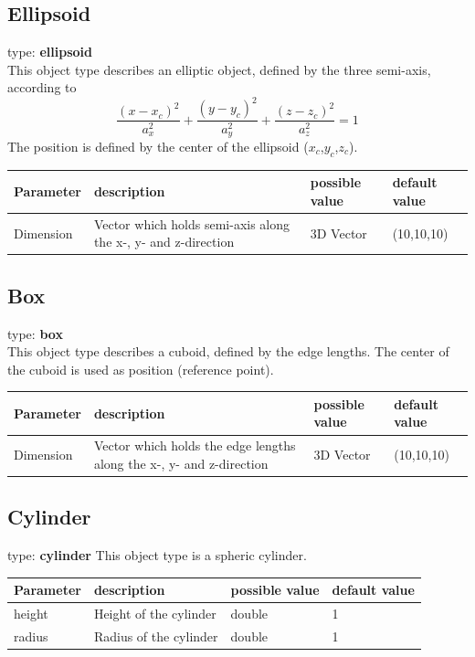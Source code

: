 \documentclass[a4paper,html,11pt,openany]{book}
\begin{document}
\subsection{Ellipsoid}
 type: \textbf {ellipsoid} \\
 This object type describes an elliptic object, defined by the three semi-axis, according to
  \begin{equation}
  \frac{(x-x_c)^2}{a_x^2}+\frac{(y-y_c)^2}{a_y^2}+\frac{(z-z_c)^2}{a_z^2}=1
\end{equation}   
The position is defined by the center of the ellipsoid ($x_c$,$y_c$,$z_c$).

\vspace{1em}
\begin{tabular}{p{2cm}|m{3.5cm}|m{3.0cm}|p{1.7cm}}
 Parameter  & description  & possible value & default value\\
 \hline
 Dimension & Vector which holds semi-axis along the x-, y- and z-direction & 3D Vector & (10,10,10) 
 \end{tabular}
 \subsection{Box}
 type: \textbf{box} \\
 This object type describes a cuboid, defined by the edge lengths. The center of the cuboid is used as position (reference point).
 
\vspace{1em} 
\begin{tabular}{p{2cm}|m{3.5cm}|m{3.0cm}|p{1.7cm}}
 Parameter  & description  & possible value & default value\\
 \hline
 Dimension & Vector which holds the edge lengths along the x-, y- and z-direction & 3D Vector & (10,10,10) 
 \end{tabular}
 
 \subsection{Cylinder}
 type: \textbf{cylinder}
 This object type is a spheric cylinder. 
 
\vspace{1em} 
\begin{tabular}{p{2cm}|m{3.5cm}|m{3.0cm}|p{1.7cm}}
 Parameter  & description  & possible value & default value\\
 \hline
height & Height of the cylinder & double & 1 \\
\hline
radius & Radius of the cylinder & double & 1 \\
\end{tabular}  
 
\end{document}
